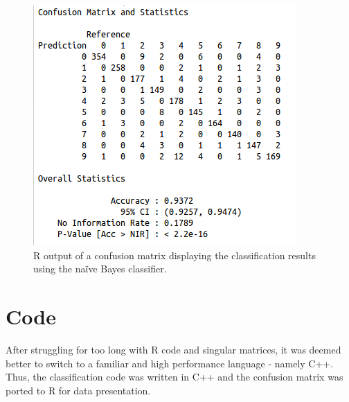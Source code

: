 \documentclass{article}
\begin{document}
\begin{figure}[h]
  \centering
  \includegraphics[width=.6\linewidth]{R_confusion_matrix_output}
  \caption{R output of a confusion matrix displaying the classification results using the na\"{i}ve Bayes classifier.}
  \label{fig:confusion_matrix}
\end{figure}

\section{Code}
After struggling for too long with R code and singular matrices, it was deemed better to switch to a familiar and high performance language - namely C++. Thus, the classification code was written in C++ and the confusion matrix was ported to R for data presentation.
\end{document}
